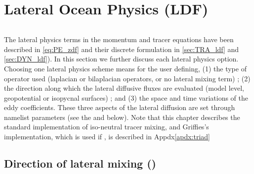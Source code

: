 \documentclass[../tex_main/NEMO_manual]{subfiles}
\begin{document}
\chapter{Lateral Ocean Physics (LDF)}
\label{chap:LDF}
\minitoc


\newpage
$\ $\newline    %


The lateral physics terms in the momentum and tracer equations have been 
described in \autoref{eq:PE_zdf} and their discrete formulation in \autoref{sec:TRA_ldf} 
and \autoref{sec:DYN_ldf}). In this section we further discuss each lateral physics option. 
Choosing one lateral physics scheme means for the user defining, 
(1) the type of operator used (laplacian or bilaplacian operators, or no lateral mixing term) ; 
(2) the direction along which the lateral diffusive fluxes are evaluated (model level, geopotential or isopycnal surfaces) ; and 
(3) the space and time variations of the eddy coefficients. 
These three aspects of the lateral diffusion are set through namelist parameters 
(see the \textit{} and \textit{} below). 
Note that this chapter describes the standard implementation of iso-neutral
tracer mixing, and Griffies's implementation, which is used if
, is described in Appdx\autoref{apdx:triad}





\section{Direction of lateral mixing (\protect{})}
\label{sec:LDF_slp}

\end{document}
